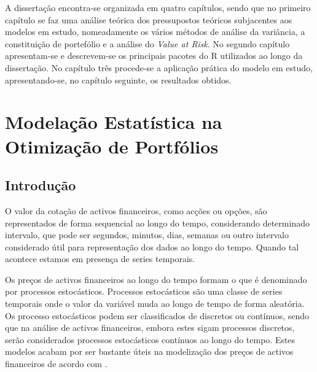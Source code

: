 \documentclass[
  12pt,
  a4paper,
  openany]{book}
\theoremstyle{definition}
\theoremstyle{definition}
\theoremstyle{definition}
\theoremstyle{remark}
\begin{document}
A dissertação encontra-se organizada em quatro capítulos, sendo que no primeiro capítulo se faz uma análise teórica dos pressupostos teóricos subjacentes aos modelos em estudo, nomeadamente os vários métodos de análise da variância, a constituição de portefólio e a análise do \emph{Value at Risk}. No segundo capítulo apresentam-se e descrevem-se os principais pacotes do R utilizados ao longo da dissertação. No capítulo três procede-se a aplicação prática do modelo em estudo, apresentando-se, no capítulo seguinte, os resultados obtidos.

\begingroup
\titleformat{\chapter}[display]
{\normalfont\huge\bfseries\centering}{\chaptertitlename\ \thechapter}{20pt}{\Huge}

\hypertarget{modelauxe7uxe3o-estatuxedstica-na-otimizauxe7uxe3o-de-portfuxf3lios}{%
\chapter{Modelação Estatística na Otimização de Portfólios}\label{modelauxe7uxe3o-estatuxedstica-na-otimizauxe7uxe3o-de-portfuxf3lios}}

\newpage

\hypertarget{introduuxe7uxe3o}{%
\section{Introdução}\label{introduuxe7uxe3o}}

O valor da cotação de activos financeiros, como acções ou opções, são representados de forma sequencial ao longo do tempo, considerando determinado intervalo, que pode ser segundos, minutos, dias, semanas ou outro intervalo considerado útil para representação dos dados ao longo do tempo. Quando tal acontece estamos em presença de series temporais.

Os preços de activos financeiros ao longo do tempo formam o que é denominado por processos estocásticos. Processos estocásticos são uma classe de series temporais onde o valor da variável muda ao longo de tempo de forma aleatória. Os processo estocásticos podem ser classificados de discretos ou contínuos, sendo que na análise de activos financeiros, embora estes sigam processos discretos, serão considerados processos estocásticos contínuos ao longo do tempo. Estes modelos acabam por ser bastante úteis na modelização dos preços de activos financeiros de acordo com \citet{Hull2018}.
\end{document}

